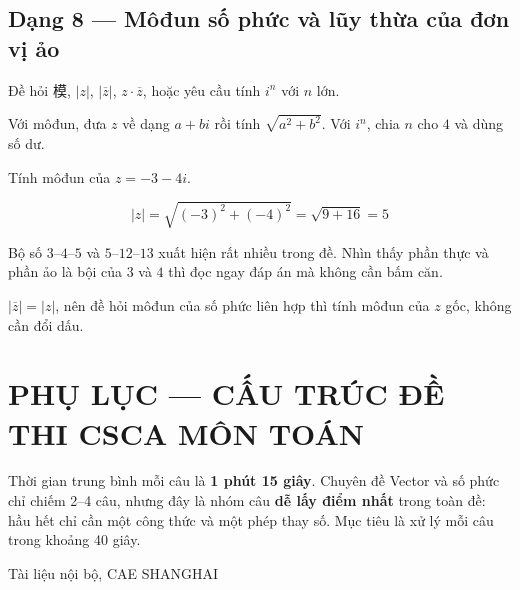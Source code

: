 \documentclass[11pt, a4paper]{article}
\begin{document}
\subsection{Dạng 8 — Môđun số phức và lũy thừa của đơn vị ảo}

 Đề hỏi 模, $\lvert z \rvert$, $\lvert \overline{z} \rvert$, $z \cdot \overline{z}$, hoặc yêu cầu tính $i^n$ với $n$ lớn.

 Với môđun, đưa $z$ về dạng $a + bi$ rồi tính $\sqrt{a^2 + b^2}$. Với $i^n$, chia $n$ cho $4$ và dùng số dư.

\begin{vidu}[{8}]
Tính môđun của $z = -3 - 4i$.

$$\lvert z \rvert = \sqrt{(-3)^2 + (-4)^2} = \sqrt{9 + 16} = 5$$

 Bộ số $3$–$4$–$5$ và $5$–$12$–$13$ xuất hiện rất nhiều trong đề. Nhìn thấy phần thực và phần ảo là bội của $3$ và $4$ thì đọc ngay đáp án mà không cần bấm căn.

 $\lvert \overline{z} \rvert = \lvert z \rvert$, nên đề hỏi môđun của số phức liên hợp thì tính môđun của $z$ gốc, không cần đổi dấu.

\end{vidu}
\section{PHỤ LỤC — CẤU TRÚC ĐỀ THI CSCA MÔN TOÁN}


Thời gian trung bình mỗi câu là \textbf{1 phút 15 giây}. Chuyên đề Vector và số phức chỉ chiếm 2–4 câu, nhưng đây là nhóm câu \textbf{dễ lấy điểm nhất} trong toàn đề: hầu hết chỉ cần một công thức và một phép thay số. Mục tiêu là xử lý mỗi câu trong khoảng 40 giây.
\vspace{0.8cm}
\begin{center}
{\footnotesize\color{cae_blue} Tài liệu nội bộ, CAE SHANGHAI}
\end{center}
\end{document}
